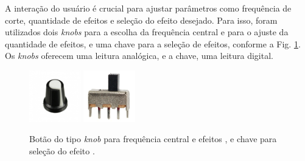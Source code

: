 A interação do usuário é crucial para ajustar parâmetros como frequência de corte, quantidade de efeitos e seleção do efeito desejado. Para isso, foram utilizados dois \textit{knobs} para a escolha da frequência central e para o ajuste da quantidade de efeitos, e uma chave para a seleção de efeitos, conforme a Fig. \ref{fig61}. Os \textit{knobs} oferecem uma leitura analógica, e a chave, uma leitura digital.


\begin{figure}[h]
    \centering
    \includegraphics[width=0.2\textwidth]{figuras/fig61.jpg}
     \includegraphics[width=0.2\textwidth]{figuras/fig62.png}
    \caption{Botão do tipo \textit{knob} para frequência central e efeitos \cite{robocore}, e chave para seleção do efeito \cite{evea}.}
    \label{fig61}
\end{figure}




